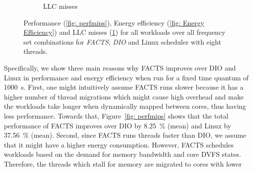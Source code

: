\begin{figure}[tb!]
\begin{subfigure}{0.5\textwidth}
        \caption{LLC misses}
        \label{fig: LLC}
    \end{subfigure}
    \caption[Performance evaluation for FACTS against DIO and Linux]{ Performance (\ref{fig: perfmips}), Energy efficiency (\ref{fig: Energy Efficiency}) and LLC misses (\ref{fig: LLC}) for all workloads over all frequency set combinations for \textit{FACTS}, \textit{DIO} and Linux scheduler with eight threads.}
    \label{fig: FACTS result}
\end{figure}
\fi


Specifically, we show three main reasons why FACTS improves over DIO and Linux in
performance and energy efficiency when run for a fixed time quantum of \SI{1000}{\second}.
First, one might intuitively assume FACTS runs slower because it has a higher number of
thread migrations which might cause high overhead and make the workloads take longer when
dynamically mapped between cores, thus having less performance.  Towards that,
Figure~\ref{fig: perfmips} shows that the total performance of FACTS improves over DIO by
\SI{8.25}{\percent} (mean) and Linux by \SI{37.56}{\percent} (mean).  Second, since FACTS
runs threads faster than DIO, we assume that it might have a higher energy consumption.
However, FACTS schedules workloads based on the demand for memory bandwidth and core DVFS states.
Therefore, the threads which stall for memory are migrated to cores with lower

